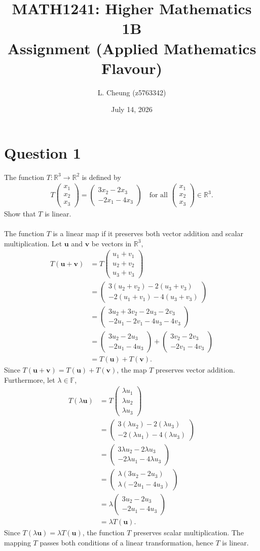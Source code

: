 \documentclass[reqno]{amsart}
\title{%
	MATH1241: Higher Mathematics 1B \\
	Assignment (Applied Mathematics Flavour)}
\author{L. Cheung (z5763342)}
\date{July 14, 2026}
\renewcommand{\vec}{\mathbf}
\newcommand{\cvec}[1]{ \begin{pmatrix} #1 \end{pmatrix} }
\begin{document}
\maketitle

\section*{\LARGE{Question 1}}

	The function $T: \mathbb{R}^3 \to \mathbb{R}^2$ is defined by
	\begin{align*}
		T\cvec{x_1\\x_2\\x_3} = \cvec{3x_2 - 2x_3\\-2x_1 - 4x_3} \quad \text{for all } \cvec{x_1\\x_2\\x_3} \in \mathbb{R}^3.
	\end{align*}
	Show that $T$ is linear.
	\\ \\
	The function $T$ is a linear map if it preserves both vector addition and scalar multiplication. Let $\vec{u}$ and $\vec{v}$ be vectors in $\mathbb{R}^3$,
	\begin{align*}
		T(\vec{u} + \vec{v}) &= T\cvec{u_1 + v_1\\u_2 + v_2\\u_3 + v_3}	\\
							 &= \cvec{3(u_2 + v_2) - 2(u_3 + v_3) \\ -2(u_1 + v_1) - 4(u_3 + v_3)}	\\
							 &= \cvec{3u_2 + 3v_2 - 2u_3 - 2v_3 \\ -2u_1 -2v_1 - 4u_3 - 4v_3}	\\
							 &= \cvec{3u_2 - 2u_3 \\ -2u_1 - 4u_3} + \cvec{3v_2 - 2v_3 \\ -2v_1 - 4v_3}	\\
							 &= T(\vec{u}) + T(\vec{v}).
	\end{align*}
	Since $T(\vec{u} + \vec{v}) = T(\vec{u}) + T(\vec{v})$, the map $T$ preserves vector addition. Furthermore, let $\lambda \in \mathbb{F}$,
	\begin{align*}
		T(\lambda \vec{u}) &= T\cvec{\lambda u_1\\\lambda u_2\\\lambda u_3}	\\
						   &= \cvec{3(\lambda u_2) - 2(\lambda u_3) \\ -2(\lambda u_1) - 4(\lambda u_3)}	\\
						   &= \cvec{3\lambda u_2 - 2\lambda u_3 \\ -2\lambda u_1 - 4\lambda u_3}	\\
						   &= \cvec{\lambda (3u_2 - 2u_3) \\ \lambda (-2u_1 - 4u_3)}	\\
						   &= \lambda \cvec{3u_2 - 2u_3 \\-2u_1 - 4u_3}	\\
						   &= \lambda T(\vec{u}).
	\end{align*}
	Since $T(\lambda \vec{u}) = \lambda T(\vec{u})$, the function $T$ preserves scalar multiplication. The mapping $T$ passes both conditions of a linear transformation, hence $T$ is linear.
\end{document}
